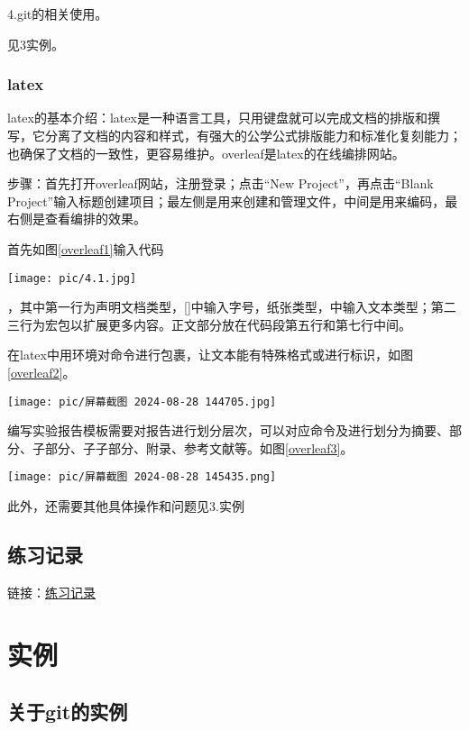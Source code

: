 \documentclass[a4paper]{article}
\begin{document}
4.git的相关使用。

见3实例。
\subsubsection{latex}
latex的基本介绍：latex是一种语言工具，只用键盘就可以完成文档的排版和撰写，它分离了文档的内容和样式，有强大的公学公式排版能力和标准化复刻能力；也确保了文档的一致性，更容易维护。overleaf是latex的在线编排网站。

步骤：首先打开overleaf网站，注册登录；点击“New Project”，再点击“Blank Project”输入标题创建项目；最左侧是用来创建和管理文件，中间是用来编码，最右侧是查看编排的效果。

首先如图\ref{overleaf1}输入代码
\begin{figure*}[!h]
    \centering
    \texttt{[image: pic/4.1.jpg]}\caption{overleaf1}\label{overleaf1}
\end{figure*}
，其中第一行为声明文档类型，[]中输入字号，纸张类型，{}中输入文本类型；第二三行为宏包以扩展更多内容。正文部分放在代码段第五行和第七行中间。

在latex中用环境对命令进行包裹，让文本能有特殊格式或进行标识，如图\ref{overleaf2}。
\begin{figure*}[h]
 \centering
    \texttt{[image: pic/屏幕截图 2024-08-28 144705.jpg]}\caption{overleaf2}\label{overleaf2}
\end{figure*}

编写实验报告模板需要对报告进行划分层次，可以对应命令及进行划分为摘要、部分、子部分、子子部分、附录、参考文献等。如图\ref{overleaf3}。
\begin{figure*}[!htb]
 \centering
    \texttt{[image: pic/屏幕截图 2024-08-28 145435.png]}\caption{overleaf3}\label{overleaf3}
\end{figure*}

此外，还需要其他具体操作和问题见3.实例
\subsection{练习记录}
链接：\href{https://github.com/yyy0202/-remote-repo/tree/main/%E7%AC%AC%E4%B8%80%E8%8A%82%E8%AF%BE/%E7%BB%83%E4%B9%A0%E8%AE%B0%E5%BD%95}{练习记录}

\section{实例}
\subsection{关于git的实例}
\end{document}

